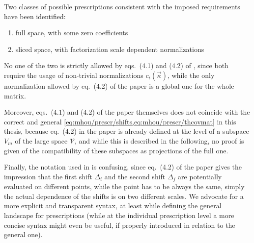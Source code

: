 
Two classes of possible prescriptions consistent with the imposed requirements
have been identified:

\begin{enumerate}
    \item full space, with some zero coefficients
    \item sliced space, with factorization scale dependent normalizations
\end{enumerate}

No one of the two is strictly allowed by eqs.\ (4.1) and (4.2) of
\cite{NNPDF:2019ubu}, since both require the usage of non-trivial
normalizations $c_i(\vec{\kappa})$, while the only normalization allowed by
eq.\ (4.2) of the paper is a global one for the whole matrix.

Moreover, eqs.\ (4.1) and (4.2) of the paper themselves does not coincide with
the correct and general \cref{eq:mhou/prescr/shifts,eq:mhou/prescr/thcovmat} in
this thesis, because eq.\ (4.2) in the paper is already defined at the level of
a subspace $V_m$ of the large space $\mathcal{V}$, and while this is described
in the following, no proof is given of the compatibility of these subspaces as
projections of the full one.

Finally, the notation used in \cite{NNPDF:2019ubu} is confusing, since eq.\
(4.2) of the paper gives the impression that the first shift $\Delta_i$ and the
second shift $\Delta_j$ are potentially evaluated on different points, while
the point has to be always the same, simply the actual dependence of the shifts
is on two different scales.
We advocate for a more explicit and transparent syntax, at least while defining
the general landscape for prescriptions (while at the individual prescription
level a more concise syntax might even be useful, if properly introduced in
relation to the general one).
